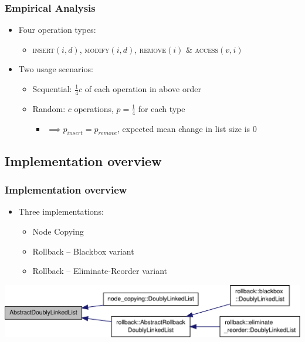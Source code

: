 \documentclass{beamer}
\begin{document}
\begin{frame}
\frametitle{Empirical Analysis}
\begin{itemize}
  \item Four operation types:
  \begin{itemize}

    \item \textsc{insert}$(i, d)$, \textsc{modify}$(i, d)$, \textsc{remove}$(i)$
    \& \textsc{access}$(v, i)$

  \end{itemize}
  \item Two usage scenarios:
  \begin{itemize}

    \item Sequential: $\frac{1}{4}c$ of each operation in above order

    \item Random: $c$ operations, $p=\frac{1}{4}$ for each type
    \begin{itemize}
      \item ${}\implies p_{insert}=p_{remove}$, expected mean change in list size is 0
    \end{itemize}
  \end{itemize}

\end{itemize}
\end{frame}

\subsection{Implementation overview}

\begin{frame}
\frametitle{Implementation overview}
\begin{itemize}
  \item Three implementations:

  \begin{itemize}
    \item Node Copying
    \item Rollback -- Blackbox variant
    \item Rollback -- Eliminate-Reorder variant
  \end{itemize}
\end{itemize}
\includegraphics[width=\textwidth]{figures/classAbstractDoublyLinkedList__inherit__graph.pdf}
\end{frame}
\end{document}
